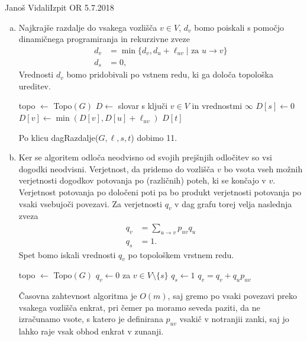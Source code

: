 \begin{naloga}{Janoš Vidali}{Izpit OR 5.7.2018}
\begin{odgovor}
\begin{enumerate}[(a)]
\item Najkrajše razdalje do vsakega vozlišča $v \in V$, 
$d_v$  bomo poiskali s pomočjo dinamičnega programiranja in rekurzivne zveze
\begin{align*}
d_v &= \min\{d_v,  d_u + \ell_{uv}| \text{ za } u \rightarrow v\} \\
d_s &= 0,
\end{align*}
Vrednosti $d_v$ bomo pridobivali po vstnem redu, ki ga določa topološka ureditev.
\begin{small}
\begin{algorithmic}
	\State topo $\gets$ {\sc Topo}$(G)$
	\State $D \gets$ slovar s ključi $v \in V$ in vrednostmi $\infty$
	\State $D[s] \gets 0$
			\State $D[v] \gets \min(D[v], D[u] + \ell_{uv})$
		\EndFor
	\EndFor
	\State \Return $D[t]$
\EndFunction
\end{algorithmic}
\end{small}
Po klicu {\sc dagRazdalje}($G, \ell, s, t$) dobimo 11.

\item Ker se algoritem odloča neodvisno od svojih prejšnjih odločitev so vsi dogodki neodvisni.
Verjetnost, da pridemo do vozlišča $v$ bo vsota vseh možnih 
verjetnosti dogodkov potovanja po (različnih) poteh, ki se končajo v $v$.
Verjetnost potovanja po določeni poti pa bo produkt verjetnosti potovanja po vsaki vsebujoči povezavi.
Za verjetnosti $q_v$ v dag grafu torej velja naslednja zveza
\begin{align*}
q_v &= \sum_{u \rightarrow v}p_{uv} q_u \\
q_s &= 1.
\end{align*}
Spet bomo iskali vrednosti $q_v$ po topološkem vrstnem redu.
\begin{small}
\begin{algorithmic}
	\State topo $\gets$ {\sc Topo}$(G)$
	\State $q_v \gets 0$ za $v \in V \setminus \{s\}$
	\State $q_s \gets 1$
			\State $q_v = q_v + q_u p_{uv}$
		\EndFor
	\EndFor
\EndFunction
\end{algorithmic}
\end{small}
Časovna zahtevnost algoritma je $O(m)$, 
saj gremo po vsaki povezavi preko vsakega vozlišča enkrat, 
pri čemer pa moramo seveda paziti, da ne izračunamo vsote, 
s katero je definirana $p_{uv}$ vsakič v notranjii zanki, 
saj jo lahko raje vsak obhod enkrat v zunanji.
\end{enumerate}
\end{odgovor}
\end{naloga}
